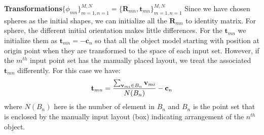 \noindent\textbf{Transformations$\{\phi_{mn}\}_{m=1,n=1}^{M,N}=\{\mathbf{R}_{mn},\mathbf{t}_{mn}\}_{m=1,n=1}^{M,N}$}
Since we have chosen spheres as the initial shapes, we can initialize all the $\mathbf{R}_{mn}$ to identity matrix. For sphere, the different initial orientation makes little differences.
%
For the $\mathbf{t}_{mn}$ we initialize them as $\mathbf{t}_{mn}=- \mathbf{c}_n$ so that all the object model starting with position at origin point when they are transformed to the space of each input set. 
%
However, if the $m^{th}$ input point set has the manually placed layout, we treat the associated $\mathbf{t}_{mn}$ differently. For this case we have:
\begin{equation}
	\label{equ:initt}
	\mathbf{t}_{mn}=\frac{\sum_{\mathbf{v}_{mi} \in B_n}\mathbf{v}_{mi}}{N(B_n)}-\mathbf{c}_n
\end{equation}
where $N(B_n)$ here is the number of element in $B_n$ and $B_n$ is the point set that is enclosed by the manually input layout (box) indicating arrangement of the $n^{th}$ object.
